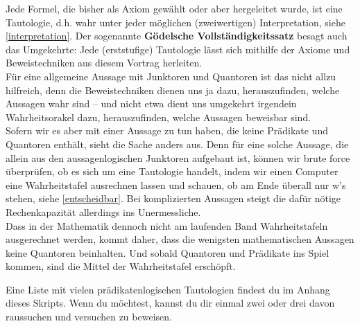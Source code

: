 \begin{bem}
 Jede Formel, die bisher als Axiom gewählt oder aber hergeleitet wurde, ist eine Tautologie, d.h. wahr unter jeder möglichen (zweiwertigen) Interpretation, siehe \cref{interpretation}. Der sogenannte \textbf{Gödelsche Vollständigkeitssatz} besagt auch das Umgekehrte: Jede (erststufige) Tautologie lässt sich mithilfe der Axiome und Beweistechniken aus diesem Vortrag herleiten. \\
Für eine allgemeine Aussage mit Junktoren und Quantoren ist das nicht allzu hilfreich, denn die Beweistechniken dienen uns ja dazu, herauszufinden, welche Aussagen wahr sind -- und nicht etwa dient uns umgekehrt irgendein Wahrheitsorakel dazu, herauszufinden, welche Aussagen beweisbar sind. \\
Sofern wir es aber mit einer Aussage zu tun haben, die keine Prädikate und Quantoren enthält, sieht die Sache anders aus. Denn für eine solche Aussage, die allein aus den aussagenlogischen Junktoren aufgebaut ist, können wir brute force überprüfen, ob es sich um eine Tautologie handelt, indem wir einen Computer eine Wahrheitstafel ausrechnen lassen und schauen, ob am Ende überall nur w's stehen, siehe \cref{entscheidbar}. Bei komplizierten Aussagen steigt die dafür nötige Rechenkapazität allerdings ins Unermessliche. \\
Dass in der Mathematik dennoch nicht am laufenden Band Wahrheitstafeln ausgerechnet werden, kommt daher, dass die wenigsten mathematischen Aussagen keine Quantoren beinhalten. Und sobald Quantoren und Prädikate ins Spiel kommen, sind die Mittel der Wahrheitstafel erschöpft.
\end{bem}


 
 
 \begin{bem}[*]
Eine Liste mit vielen prädikatenlogischen Tautologien findest du im Anhang dieses Skripts. Wenn du möchtest, kannst du dir einmal zwei oder drei davon raussuchen und versuchen zu beweisen.
\end{bem}



